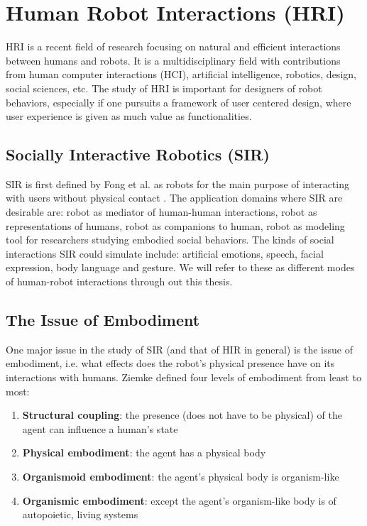 \section{Human Robot Interactions (HRI)}

HRI is a recent field of research focusing on natural and efficient interactions between humans and robots.  It is a multidisciplinary field with contributions from human computer interactions (HCI), artificial intelligence, robotics, design, social sciences, etc.  The study of HRI is important for designers of robot behaviors, especially if one pursuits a framework of user centered design, where user experience is given as much value as functionalities. 


\subsection{Socially Interactive Robotics (SIR)}
SIR is first defined by Fong et al. as robots for the main purpose of interacting with users without physical contact \cite{fong2003survey}.  The application domains where SIR are desirable are: robot as mediator of human-human interactions, robot as representations of humans, robot as companions to human, robot as modeling tool for researchers studying embodied social behaviors.  The kinds of social interactions SIR could simulate include: artificial emotions, speech, facial expression, body language and gesture.  We will refer to these as different modes of human-robot interactions through out this thesis.


\subsection{The Issue of Embodiment}
One major issue in the study of SIR (and that of HIR in general) is the issue of embodiment, i.e. what effects does the robot's physical presence have on its interactions with humans.  Ziemke \cite{ziemke2001disentangling} defined four levels of embodiment from least to most:
\begin{enumerate}
	\item \textbf{Structural coupling}: the presence (does not have to be physical) of the agent can influence a human's state
	\item \textbf{Physical embodiment}: the agent has a physical body
	\item \textbf{Organismoid embodiment}: the agent's physical body is organism-like
	\item \textbf{Organismic embodiment}: except the agent's organism-like body is of autopoietic, living systems
\end{enumerate}


